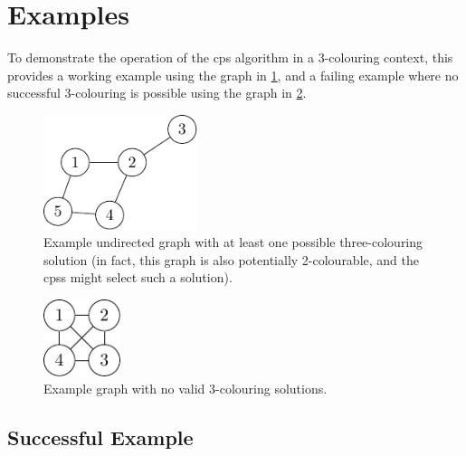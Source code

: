 \section{\label{sec:gcol:examples}Examples}

To demonstrate the operation of the \gls{cps} algorithm in a 3-colouring context, this  provides a working example using the graph in \cref{fig:gcol:examplegraph}, and a failing example where no successful 3-colouring is possible using the graph in \cref{fig:gcol:examplegraphnosol}.

\begin{figure}
    \centering
    \includegraphics[width=0.4\textwidth]{chapters/gcol/figs/examplegraph1-figure2.pdf}
    \caption[Example graph with at least one possible three-colouring solution]{Example undirected graph with at least one possible three-colouring solution (in fact, this graph is also potentially 2-colourable, and the \glspl{cps} might select such a solution).}
    \label{fig:gcol:examplegraph}
\end{figure}

\begin{figure}
    \centering
    \includegraphics[width=0.2\textwidth]{chapters/gcol/figs/examplegraph1-figure3.pdf}
    \caption{Example graph with no valid 3-colouring solutions.}
    \label{fig:gcol:examplegraphnosol}
\end{figure}

\subsection{Successful Example}

